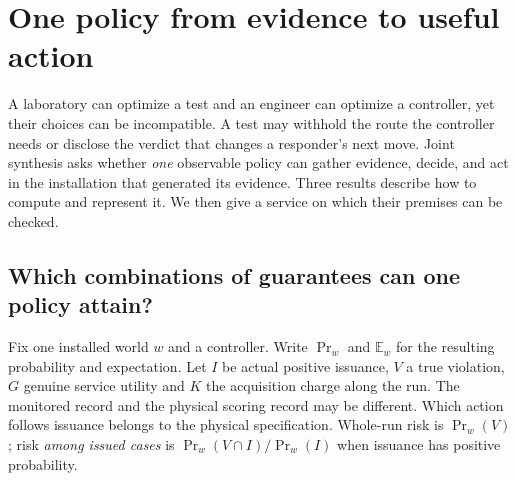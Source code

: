 \section{One policy from evidence to useful action}\label{sec:unified}
A laboratory can optimize a test and an engineer can optimize a controller, yet their choices can be incompatible. A test may withhold the route the controller needs or disclose the verdict that changes a responder's next move. Joint synthesis asks whether \emph{one} observable policy can gather evidence, decide, and act in the installation that generated its evidence. Three results describe how to compute and represent it. We then give a service on which their premises can be checked.

\subsection{Which combinations of guarantees can one policy attain?}\label{body:joint}
Fix one installed world \(w\) and a controller. Write \(\Pr_w\) and \(\mathbb E_w\) for the resulting probability and expectation. Let \(I\) be actual positive issuance, \(V\) a true violation, \(G\) genuine service utility and \(K\) the acquisition charge along the run. The monitored record and the physical scoring record may be different. Which action follows issuance belongs to the physical specification. Whole-run risk is \(\Pr_w(V)\); risk \emph{among issued cases} is \(\Pr_w(V\cap I)/\Pr_w(I)\) when issuance has positive probability.

